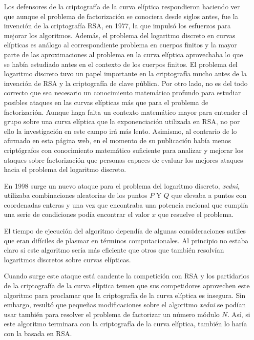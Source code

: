\documentclass[
  a4paper,
  12pt,
  spanish,
]{scrartcl}
\begin{document}
Los defensores de la criptografía de la curva elíptica respondieron haciendo ver que aunque el problema de factorización se conociera desde siglos antes, fue la invención de la criptografía RSA, en 1977, la que impulsó los esfuerzos para mejorar los algoritmos. Además, el problema del logaritmo discreto en curvas elípticas es análogo al correspondiente problema en cuerpos finitos y la mayor parte de las aproximaciones al problema en la curva elíptica aprovechaba lo que se había estudiado antes en el contexto de los cuerpos finitos. El problema del logaritmo discreto tuvo un papel importante en la criptografía mucho antes de la invención de RSA y la criptografía de clave pública. Por otro lado, no es del todo correcto que sea necesario un conocimiento matemático profundo para estudiar posibles ataques en las curvas elípticas más que para el problema de factorización. Aunque haga falta un contexto matemático mayor para entender el grupo sobre una curva elíptica que la exponenciación utilizada en RSA, no por ello la investigación en este campo irá más lento. Asimismo, al contrario de lo afirmado en esta página web, en el momento de su publicación había menos criptógrafos con conocimiento matemático suficiente para analizar y mejorar los ataques sobre factorización que personas capaces de evaluar los mejores ataques hacia el problema del logaritmo discreto.

En 1998 surge un nuevo ataque para el problema del logaritmo discreto, \textit{xedni}, utilizaba combinaciones aleatorias de los puntos $P$ Y $Q$ que elevaba a puntos con coordenadas enteras y una vez que encontraba una potencia racional que cumplía una serie de condiciones podía encontrar el valor $x$ que resuelve el problema.

El tiempo de ejecución del algoritmo dependía de algunas consideraciones sutiles que eran difíciles de plasmar en términos computacionales. Al principio no estaba claro si este algoritmo sería más eficiente que otros que también resolvían logaritmos discretos sobre curvas elípticas.

Cuando surge este ataque está candente la competición con RSA y los partidarios de la criptografía de la curva elíptica temen que sus competidores aprovechen este algoritmo para proclamar que la criptografía de la curva elíptica es insegura. Sin embargo, resultó que pequeñas modificaciones sobre el algoritmo \textit{xedni} se podían usar también para resolver el problema de factorizar un número módulo $N$. Así, si este algoritmo terminara con la criptografía de la curva elíptica, también lo haría con la basada en RSA.
\end{document}
